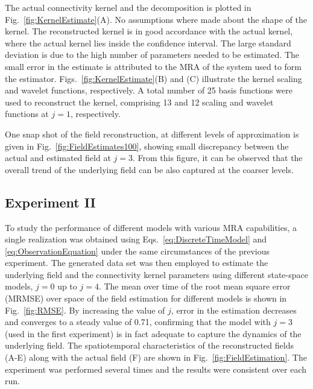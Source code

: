 \documentclass[review,authoryear,3p]{elsarticle}
\begin{document}
The actual connectivity kernel and the decomposition is plotted in Fig.~\ref{fig:KernelEstimate}(A). No assumptions where made about the shape of the kernel. The reconstructed kernel is in good accordance with the actual kernel, where the actual kernel lies inside the confidence interval. The large standard deviation is due to the high number of parameters needed to be estimated. The small error in the estimate is attributed to the MRA of the system used to form the estimator. Figs.~\ref{fig:KernelEstimate}(B) and (C) illustrate the kernel scaling and wavelet functions, respectively. A total number of 25 basis functions were used to reconstruct the kernel, comprising 13 and 12 scaling and wavelet functions at $j=1$, respectively. 

One snap shot of the field reconstruction, at different levels of approximation is given in Fig.~\ref{fig:FieldEstimates100}, showing small discrepancy between the actual and estimated field at $j=3$. From this figure, it can be observed that the overall trend of the underlying field can be also captured at the coarser levels.
\subsection{Experiment II}
To study the performance of different models with various MRA capabilities, a single realization was obtained using Eqs.~\eqref{eq:DiscreteTimeModel} and \eqref{eq:ObservationEquation} under the same circumstances of the previous experiment. The generated data set was then employed to estimate the underlying field and the connectivity kernel parameters using different state-space models, $j=0$ up to $j=4$. The mean over time of the root mean square error (MRMSE) over space of the field estimation for different models is shown in Fig.~\ref{fig:RMSE}. By increasing the value of $j$, error in the estimation decreases and converges to a steady value of 0.71, confirming that the model with $j=3$ (used in the first experiment) is in fact adequate to capture the dynamics of the underlying field. The spatiotemporal characteristics of the reconstructed fields (A-E) along with the actual field (F)  are shown in Fig.~\ref{fig:FieldEstimation}. The experiment was performed several times and the results were consistent over each run.
\end{document}
